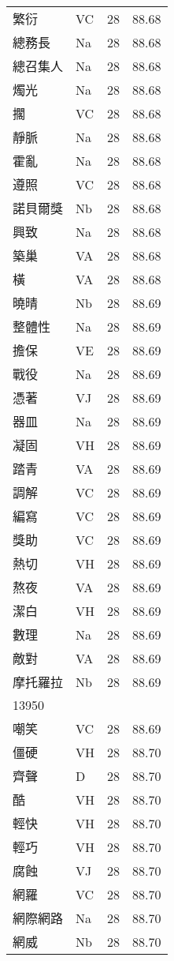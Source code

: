 \documentclass[twocolumn]{book}
\begin{document}
\begin{supertabular}{llrr}
繁衍 & VC & 28 &  88.68\\
總務長 & Na & 28 &  88.68\\
總召集人 & Na & 28 &  88.68\\
燭光 & Na & 28 &  88.68\\
擱 & VC & 28 &  88.68\\
靜脈 & Na & 28 &  88.68\\
霍亂 & Na & 28 &  88.68\\
遵照 & VC & 28 &  88.68\\
諾貝爾獎 & Nb & 28 &  88.68\\
興致 & Na & 28 &  88.68\\
築巢 & VA & 28 &  88.68\\
橫 & VA & 28 &  88.68\\
曉晴 & Nb & 28 &  88.69\\
整體性 & Na & 28 &  88.69\\
擔保 & VE & 28 &  88.69\\
戰役 & Na & 28 &  88.69\\
憑著 & VJ & 28 &  88.69\\
器皿 & Na & 28 &  88.69\\
凝固 & VH & 28 &  88.69\\
踏青 & VA & 28 &  88.69\\
調解 & VC & 28 &  88.69\\
編寫 & VC & 28 &  88.69\\
獎助 & VC & 28 &  88.69\\
熱切 & VH & 28 &  88.69\\
熬夜 & VA & 28 &  88.69\\
潔白 & VH & 28 &  88.69\\
數理 & Na & 28 &  88.69\\
敵對 & VA & 28 &  88.69\\
摩托羅拉 & Nb & 28 &  88.69\\
13950\\
嘲笑 & VC & 28 &  88.69\\
僵硬 & VH & 28 &  88.70\\
齊聲 & D & 28 &  88.70\\
酷 & VH & 28 &  88.70\\
輕快 & VH & 28 &  88.70\\
輕巧 & VH & 28 &  88.70\\
腐蝕 & VJ & 28 &  88.70\\
網羅 & VC & 28 &  88.70\\
網際網路 & Na & 28 &  88.70\\
網威 & Nb & 28 &  88.70\\

\end{supertabular}
\end{document}
